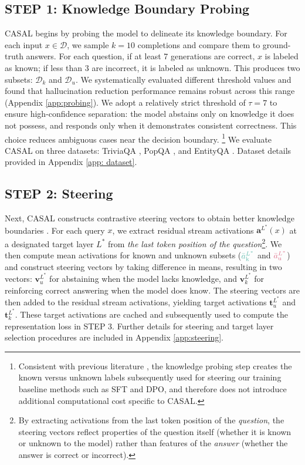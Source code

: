\documentclass{article} %
\newcommand{\known}[1]{\textcolor{KnownGreen}{#1}}
\newcommand{\unknown}[1]{\textcolor{UnknownRed}{#1}}
\begin{document}
\subsection{ STEP 1: Knowledge Boundary Probing}
CASAL begins by probing the model to delineate its knowledge boundary. For each input $x \in \mathcal{D}$, we sample $k=10$ completions and compare them to ground-truth answers. For each question, if at least 7 generations are correct, $x$ is labeled as \known{known}; if less than 3 are incorrect, it is labeled as \unknown{unknown}. This produces two subsets: \known{$\mathcal{D}_{k}$} and \unknown{$\mathcal{D}_{u}$}. We systematically evaluated different threshold values and found that hallucination reduction performance remains robust across this range (Appendix \ref{app:probing}). We adopt a relatively strict threshold of $\tau=7$ to ensure high-confidence separation: the model abstains only on knowledge it does not possess, and responds only when it demonstrates consistent correctness. This choice reduces ambiguous cases near the decision boundary. \footnote{Consistent with previous literature \citep{ferrando2025entity, grattafiori2024llama3herdmodels}, the knowledge probing step creates the known versus unknown labels subsequently used for steering our training baseline methods such as SFT and DPO, and therefore does not introduce additional computational cost specific to CASAL.} We evaluate CASAL on three datasets: TriviaQA \citep{triviaqa}, PopQA \citep{popqa}, and EntityQA \citep{ferrando2025entity}. Dataset details provided in Appendix \ref{app: dataset}.


\subsection{STEP 2: Steering}
Next, CASAL constructs contrastive steering vectors to obtain better knowledge boundaries \citep{contrastive_activation_addition, turner2024steering, arditi2024refusal}. For each query $x$, we extract residual stream activations $\mathbf{a}^{L^{*}}(x)$ at a designated target layer $L^{*}$ from \textit{the last token position of the question}\footnote{By extracting activations from the last token position of the \textit{question}, the steering vectors reflect properties of the question itself (whether it is known or unknown to the model) rather than features of the \textit{answer} (whether the answer is correct or incorrect).}. We then compute mean activations for \known{known} and \unknown{unknown} subsets ($\known{\bar{a}^{L^*}_{\mathrm{k}}}$ and $\unknown{\bar{a}^{L^*}_{\mathrm{u}}}$) and construct steering vectors by taking difference in means, resulting in two vectors: \unknown{$\mathbf{v}^{L^{*}}_{u}$} for abstaining when the model lacks knowledge, and \known{$\mathbf{v}^{L^{*}}_{k}$} for reinforcing correct answering when the model does know. The steering vectors are then added to the residual stream activations, yielding target activations \unknown{$\mathbf{t}^{L^{*}}_{u}$} and \known{$\mathbf{t}^{L^{*}}_{k}$}. These target activations are cached and subsequently used to compute the representation loss in STEP 3. Further details for steering and target layer selection procedures are included in Appendix \ref{app:steering}.
\end{document}
